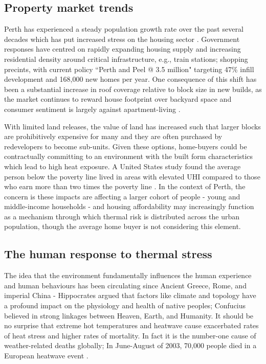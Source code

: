 \documentclass[a4paper, 12pt]{report}
\begin{document}
\subsection{Property market trends}
Perth has experienced a steady population growth rate over the past several decades \parencite{ABS-data} which has put increased stress on the housing sector \parencite{Curtin-housing-report}. Government responses have centred on rapidly expanding housing supply and increasing residential density around critical infrastructure, e.g., train stations; shopping precints, with current policy ``Perth and Peel @ 3.5 million" \parencite{perth_peel} targeting 47\% infill development and 168,000 new homes per year. One consequence of this shift has been a substantial increase in roof coverage relative to block size in new builds, as the market continues to reward house footprint over backyard space \parencite{Rambo} and consumer sentiment is largely against apartment-living \parencite{high_rises_suck}. 

With limited land releases, the value of land has increased such that larger blocks are prohibitively expensive for many and they are often purchased by redevelopers to become sub-units. Given these options, home-buyers could be contractually committing to an environment with the built form characteristics which lead to high heat exposure. A United States study found the average person below the poverty line lived in areas with elevated UHI compared to those who earn more than two times the poverty line \parencite{Low-income-high-UHI}. In the context of Perth, the concern is these impacts are affecting a larger cohort of people - young and middle-income households - and housing affordability may increasingly function as a mechanism through which thermal risk is distributed across the urban population, though the average home buyer is not considering this element.
%
\subsection{The human response to thermal stress}
The idea that the environment fundamentally influences the human experience and human behaviours has been circulating since Ancient Greece, Rome, and imperial China - Hippocrates argued that factors like climate and topology have a profound impact on the physiology and health of native peoples; Confucius believed in strong linkages between Heaven, Earth, and Humanity. It should be no surprise that extreme hot temperatures and heatwave cause exacerbated rates of heat stress and higher rates of mortality. In fact it is the number-one cause of weather-related deaths globally; In June-August of 2003, 70,000 people died in a European heatwave event \parencite{WHO}. 
\end{document}
